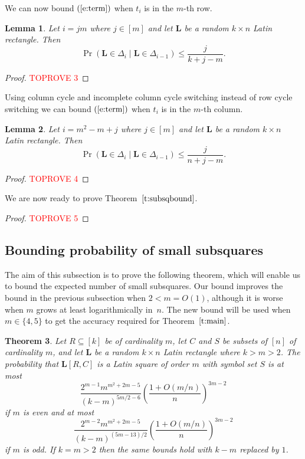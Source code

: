 \documentclass[12pt]{article}
\newtheorem{thm}{Theorem}[section]
\newtheorem{lem}[thm]{Lemma}
\theoremstyle{definition}
\numberwithin{equation}{section}
\def\eref#1{$(\ref{#1})$}
\def\tref#1{Theorem~$\ref{#1}$}
\renewcommand{\leq}{\leqslant}
\renewcommand{\L}{\mathbf{L}}
\begin{document}
	
	We can now bound \eref{e:term} when $t_i$ is in the $m$-th row.
	
	\begin{lem}\label{l:setrowcycs}
		Let $i=jm$ where $j\in[m]$ and let $\L$ be a random $k \times n$
		Latin rectangle. Then
		\[
		\Pr(\L \in \Delta_i \mid  \L \in \Delta_{i-1}) \leq \frac{j}{k+j-m}.
		\]
	\end{lem}
	
	\begin{proof}\textcolor{red}{TOPROVE 3}\end{proof}
	
	Using column cycle and incomplete column cycle switching instead of
	row cycle switching we can bound \eref{e:term} when $t_i$ is in the
	$m$-th column.
	
	\begin{lem}\label{l:setcolcycs}
		Let $i=m^2-m+j$ where $j\in[m]$
		and let $\L$ be a random $k \times n$ Latin rectangle. Then
		\[
		\Pr(\L \in \Delta_i \mid  \L \in \Delta_{i-1}) \leq \frac j{n+j-m}.
		\]
	\end{lem}
	
	\begin{proof}\textcolor{red}{TOPROVE 4}\end{proof}
	
	We are now ready to prove \tref{t:subsqbound}.
	
	\begin{proof}\textcolor{red}{TOPROVE 5}\end{proof}
	
	
	\subsection{Bounding probability of small subsquares}\label{ss:subsq4bound}
	
	The aim of this subsection is to prove the following theorem,
	which will enable us to bound the expected number of small
	subsquares. Our bound improves the bound in the previous
	subsection when $2<m=O(1)$, although it is worse when $m$ grows
	at least logarithmically in~$n$. The new bound will be used
	when $m\in\{4,5\}$ to get the accuracy required for \tref{t:main}.
	
	\begin{thm}\label{t:subsq4boundgen}
		Let $R \subseteq [k]$ be of cardinality $m$, let $C$ and $S$ be
		subsets of $[n]$ of cardinality $m$, and let $\L$ be a random
		$k\times n$ Latin rectangle where $k>m>2$.
		The probability that $\L[R, C]$ is a Latin
		square of order $m$ with symbol set $S$ is at most
		\[
		\frac{2^{m-1}m^{m^2+2m-5}}{(k-m)^{5m/2-6}}\left(\frac{1+O(m/n)}n\right)^{3m-2}
		\]
		if $m$ is even and at most
		\[
		\frac{2^{m-2}m^{m^2+2m-5}}{(k-m)^{(5m-13)/2}}\left(\frac{1+O(m/n)}n\right)^{3m-2}
		\]
		if $m$ is odd. If $k=m>2$ then the same bounds hold with $k-m$ replaced by $1$.
	\end{thm}
	
\end{document}
